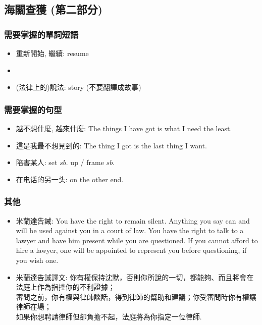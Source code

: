 \subsection{海關查獲 (第二部分)}
\subsubsection*{需要掌握的單詞短語}
\begin{itemize}
  \itemsep0em
  \item 重新開始, 繼續: resume
  \item {}
  \item (法律上的)說法: story (不要翻譯成故事)
\end{itemize}

\subsubsection*{需要掌握的句型}
\begin{itemize}
  \itemsep0em
  \item 越不想什麼, 越來什麼: The things I have got is what I need the least.
  \item 這是我最不想見到的: The thing I got is the last thing I want.
  \item 陷害某人: set $sb.$ up / frame $sb.$
  \item 在电话的另一头: on the other end.
\end{itemize}

\subsubsection*{其他}
\begin{itemize}
  \itemsep0em
  \item 米蘭達告誡: You have the right to remain silent. Anything you say can and will be used against you in a court of law. You have the right to talk to a lawyer and have him present while you are questioned. If you cannot afford to hire a lawyer, one will be appointed to represent you before questioning, if you wish one.
  \item 米蘭達告誡譯文: 你有權保持沈默，否則你所說的一切，都能夠、而且將會在法庭上作為指控你的不利證據；\\ 審問之前，你有權與律師談話，得到律師的幫助和建議；你受審問時你有權讓律師在場；\\ 如果你想聘請律師但卻負擔不起，法庭將為你指定一位律師.
\end{itemize}

